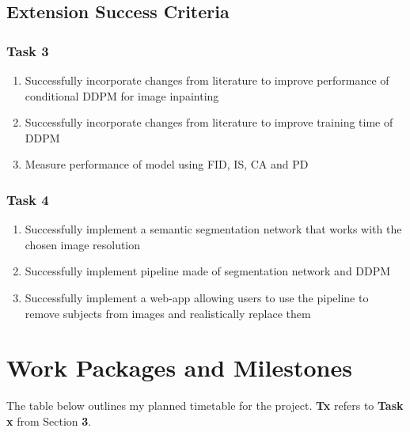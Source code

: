 \documentclass{article}
\begin{document}
\subsection{Extension Success Criteria}

\subsubsection{Task 3}
\begin{enumerate}
    \item Successfully incorporate changes from literature to improve performance of conditional DDPM for image inpainting
    \item Successfully incorporate changes from literature to improve training time of DDPM
    \item Measure performance of model using FID, IS, CA and PD
\end{enumerate}
\subsubsection{Task 4}
\begin{enumerate}
    \item Successfully implement a semantic segmentation network that works with the chosen image resolution
    \item Successfully implement pipeline made of segmentation network and DDPM
    \item Successfully implement a web-app allowing users to use the pipeline to remove subjects from images and realistically replace them
\end{enumerate}

\newpage

\section{Work Packages and Milestones}

The table below outlines my planned timetable for the project. \textbf{Tx} refers to \textbf{Task x} from Section \textbf{3}.
\end{document}
